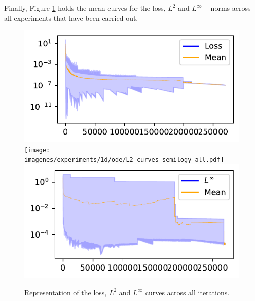 \documentclass[12pt]{report} %
\begin{document}
Finally,
Figure \ref{fig:ode-1d-results-all} holds the mean curves for the loss, $L^2$ and $L^\infty-$norms across all experiments that have been carried out.

\begin{figure}[h]
  \includegraphics[width=.7\textwidth]{imagenes/experiments/1d/ode/Loss_curves_semilogy_all.pdf}
  \texttt{[image: imagenes/experiments/1d/ode/L2\_curves\_semilogy\_all.pdf]}
  \includegraphics[width=.7\textwidth]{imagenes/experiments/1d/ode/Linf_curves_semilogy_all.pdf}
  \caption{Representation of the loss, $L^2$ and $L^\infty$ curves across all iterations.}
  \label{fig:ode-1d-results-all}
\end{figure}
\end{document}

